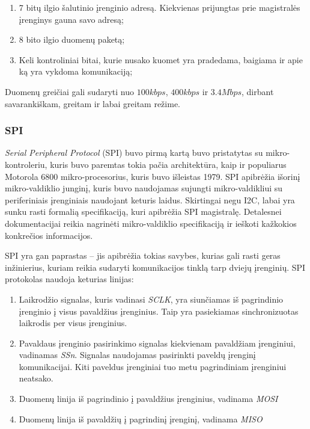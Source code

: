\begin{enumerate}
    \item 7 bitų ilgio šalutinio įrenginio adresą. Kiekvienas prijungtas prie magistralės įrenginys gauna savo adresą;
    \item 8 bito ilgio duomenų paketą;
    \item Keli kontroliniai bitai, kurie nusako kuomet yra pradedama, baigiama ir apie ką yra vykdoma komunikaciją;
\end{enumerate}

Duomenų greičiai gali sudaryti nuo $100 kbps$, $400 kbps$ ir $3.4 Mbps$, dirbant savarankiškam, greitam ir labai greitam režime.

\subsubsection{SPI}

\textit{Serial Peripheral Protocol} (SPI) buvo pirmą kartą buvo pristatytas su mikro-kontroleriu, kuris buvo paremtas tokia pačia architektūra, kaip ir populiarus Motorola 6800 mikro-procesorius, kuris buvo išleistas 1979.
SPI apibrėžia išorinį mikro-valdiklio junginį, kuris buvo naudojamas sujungti mikro-valdikliui su periferiniais įrenginiais naudojant keturis laidus.
Skirtingai negu I2C, labai yra sunku rasti formalią specifikaciją, kuri apibrėžia SPI magistralę.
Detalesnei dokumentacijai reikia nagrinėti mikro-valdiklio specifikaciją ir ieškoti kažkokios konkrečios informacijos.

SPI yra gan paprastas -- jis apibrėžia tokias savybes, kurias gali rasti geras inžinierius, kuriam reikia sudaryti komunikacijos tinklą tarp dviejų įrenginių.
SPI protokolas naudoja keturias linijas:

\begin{enumerate}
    \item Laikrodžio signalas, kuris vadinasi \textit{SCLK}, yra siunčiamas iš pagrindinio įrenginio į visus pavaldžius įrenginius. Taip yra pasiekiamas sinchronizuotas laikrodis per visus įrenginius.
    \item Pavaldaus įrenginio pasirinkimo signalas kiekvienam pavaldžiam įrenginiui, vadinamas \textit{SSn}. Signalas naudojamas pasirinkti paveldų įrenginį komunikacijai. Kiti paveldus įrenginiai tuo metu pagrindiniam įrenginiui neatsako.
    \item Duomenų linija iš pagrindinio į pavaldžius įrenginius, vadinama \textit{MOSI}
    \item Duomenų linija iš pavaldžių į pagrindinį įrenginį, vadinama \textit{MISO}
\end{enumerate}

